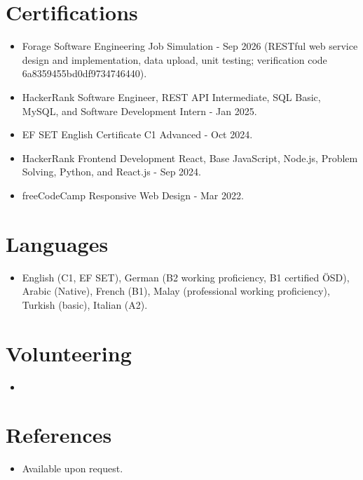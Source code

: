 \documentclass[11pt,a4paper,sans]{moderncv}
\begin{document}
\section{Certifications}
\vspace{1pt}
\begin{itemize}
\item {Forage Software Engineering Job Simulation - Sep 2026 (RESTful web service design and implementation, data upload, unit testing; verification code 6a8359455bd0df9734746440).}
\item {HackerRank Software Engineer, REST API Intermediate, SQL Basic, MySQL, and Software Development Intern - Jan 2025.}
\item {EF SET English Certificate C1 Advanced - Oct 2024.}
\item {HackerRank Frontend Development React, Base JavaScript, Node.js, Problem Solving, Python, and React.js - Sep 2024.}
\item {freeCodeCamp Responsive Web Design - Mar 2022.}
\end{itemize}

\section{Languages}
\vspace{1pt}
\begin{itemize}
\item {English (C1, EF SET), German (B2 working proficiency, B1 certified \"{O}SD), Arabic (Native), French (B1), Malay (professional working proficiency), Turkish (basic), Italian (A2).}
\end{itemize}

\section{Volunteering}
\vspace{1pt}
\begin{itemize}
\item{}
\end{itemize}

\section{References}
\vspace{1pt}
\begin{itemize}
\item{Available upon request.}
\end{itemize}
\end{document}
